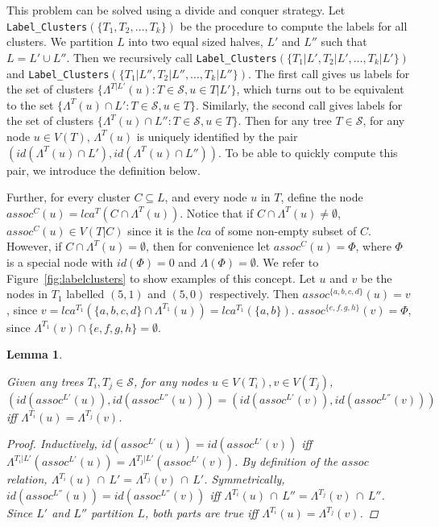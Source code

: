 \documentclass[12pt,a4paper]{article}
\newcommand{\leafset}{\Lambda}
\newtheorem{labelclusterscorrectness}[incompatibility]{Lemma}
\begin{document}
    This problem can be solved using a divide and conquer strategy. Let \texttt{Label\_Clusters}$(\{T_1, T_2, \dots, T_k\})$ be the procedure to compute the labels for all clusters. We partition $L$ into two equal sized halves, $L'$ and $L''$ such that $L = L' \cup L''$. Then we recursively call \texttt{Label\_Clusters}$(\{T_1|L', T_2|L', \dots, T_k|L'\})$ and \texttt{Label\_Clusters}$(\{T_1|L'', T_2|L'', \dots, T_k|L''\})$. The first call gives us labels for the set of clusters $\{\leafset^{T|L'}(u) : T \in \mathcal{S}, u \in T|L'\}$, which turns out to be equivalent to the set $\{\leafset^{T}(u) \cap L' : T \in \mathcal{S}, u \in T\}$. Similarly, the second call gives labels for the set of clusters $\{\leafset^{T}(u) \cap L'' : T \in \mathcal{S}, u \in T\}$. Then for any tree $T \in \mathcal{S}$, for any node $u \in V(T)$, $\leafset^T(u)$ is uniquely identified by the pair $(id(\leafset^T(u) \cap L'), id(\leafset^T(u) \cap L''))$. To be able to quickly compute this pair, we introduce the definition below.

    Further, for every cluster $C \subseteq L$, and every node $u$ in $T$, define the node $assoc^C(u) = lca^T(C \cap \leafset^T(u))$. Notice that if $C \cap \leafset^T(u) \neq \emptyset$, $assoc^C(u) \in V(T|C)$ since it is the $lca$ of some non-empty subset of $C$. However, if $C \cap \leafset^T(u) = \emptyset$, then for convenience let $assoc^{C}(u) = \Phi$, where $\Phi$ is a special node with $id(\Phi) = 0$ and $\leafset(\Phi) = \emptyset$. We refer to Figure~\ref{fig:labelclusters} to show examples of this concept. Let $u$ and $v$ be the nodes in $T_1$ labelled $(5, 1)$ and $(5, 0)$ respectively. Then $assoc^{\{a, b, c, d\}}(u) = v$, since $v = lca^{T_1}(\{a, b, c, d\} \cap \leafset^{T_1}(u)) = lca^{T_1}(\{a, b\})$. $assoc^{\{e, f, g, h\}}(v) = \Phi$, since $\leafset^{T_1}(v) \cap \{e, f, g, h\} = \emptyset$.
    \newline

    \begin{labelclusterscorrectness}
        \label{lem:labelclusterscorrectness}

        Given any trees $T_i, T_j \in \mathcal{S}$, for any nodes $u \in V(T_i), v \in V(T_j)$, $(id(assoc^{L'}(u)), id(assoc^{L''}(u))) = (id(assoc^{L'}(v)), id(assoc^{L''}(v)))$ iff $\leafset^{T_i}(u) = \leafset^{T_j}(v)$.

        \begin{proof}
            Inductively, $id(assoc^{L'}(u)) = id(assoc^{L'}(v))$ iff $\leafset^{T_i|L'}(assoc^{L'}(u)) = \leafset^{T_j|L'}(assoc^{L'}(v))$. By definition of the $assoc$ relation, $\leafset^{T_i}(u)\, \cap\, L' = \leafset^{T_j}(v)\, \cap\, L'$. Symmetrically, $id(assoc^{L''}(u)) = id(assoc^{L''}(v))$ iff $\leafset^{T_i}(u)\, \cap\, L'' = \leafset^{T_j}(v)\, \cap\, L''$. Since $L'$ and $L''$ partition $L$, both parts are true iff $\leafset^{T_i}(u) = \leafset^{T_j}(v)$.
        \end{proof}
    \end{labelclusterscorrectness}
\end{document}
